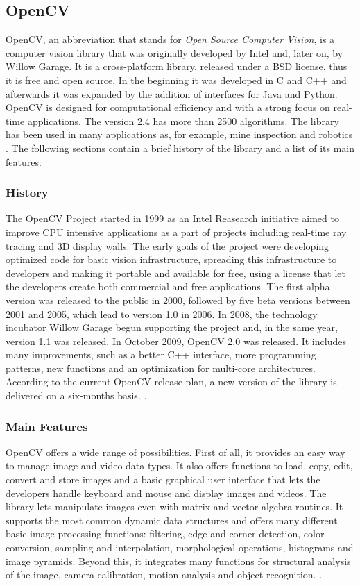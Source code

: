   \subsection{OpenCV}
	OpenCV, an abbreviation that stands for \emph{Open Source Computer Vision}, is a computer vision library that was originally developed by Intel and, later on, by Willow Garage.
	It is a cross-platform library, released under a BSD license, thus it is free and open source. In the beginning it was developed in C and C++ and afterwards it was expanded by the addition of interfaces for Java and Python. OpenCV is designed for computational efficiency and with a strong focus on real-time applications. The version 2.4 has more than 2500 algorithms. The library has been used in many applications as, for example, mine inspection and robotics \cite{OpenCV:MainWebPage}. The following sections contain a brief history of the library and a list of its main features.
		
	\subsubsection*{History}
	The OpenCV Project started in 1999 as an Intel Reasearch initiative aimed to improve CPU intensive applications as a part of projects including real-time ray tracing and 3D display walls. The early goals of the project were developing optimized code for basic vision infrastructure, spreading this infrastructure to developers and making it portable and available for free, using a license that let the developers create both commercial and free applications.\newline
	The first alpha version was released to the public in 2000, followed by five beta versions between 2001 and 2005, which lead to version 1.0 in 2006. In 2008, the technology incubator Willow Garage begun supporting the project and, in the same year, version 1.1  was released.
	In October 2009, OpenCV 2.0 was released. It includes many improvements, such as a better C++ interface, more programming patterns, new functions and an optimization for multi-core architectures. According to the current OpenCV release plan, a new version of the library is delivered on a six-months basis. \cite{OpenCV:ChangeLogs}.
	
	\subsubsection*{Main Features}
	OpenCV offers a wide range of possibilities. First of all, it provides an easy way to manage image and video data types. It also offers functions to load, copy, edit, convert and store images and a basic graphical user interface that lets the developers handle keyboard and mouse and display images and videos. The library lets manipulate images even with matrix and vector algebra routines. It supports the most common dynamic data structures and offers many different basic image processing functions: filtering, edge and corner detection, color conversion, sampling and interpolation, morphological operations, histograms and image pyramids. Beyond this, it integrates many functions for structural analysis of the image, camera calibration, motion analysis and object recognition. \cite{Agam2006}.

